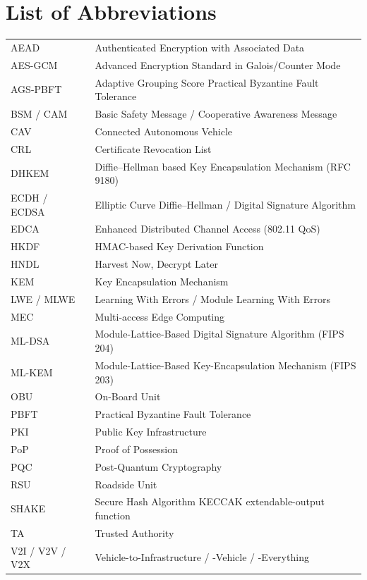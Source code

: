 \chapter*{List of Abbreviations}
\begin{longtable}{@{}p{3cm}p{11cm}@{}}
AEAD & Authenticated Encryption with Associated Data \\
AES-GCM & Advanced Encryption Standard in Galois/Counter Mode \\
AGS-PBFT & Adaptive Grouping Score Practical Byzantine Fault Tolerance \\
BSM / CAM & Basic Safety Message / Cooperative Awareness Message \\
CAV & Connected Autonomous Vehicle \\
CRL & Certificate Revocation List \\
DHKEM & Diffie--Hellman based Key Encapsulation Mechanism (RFC 9180) \\
ECDH / ECDSA & Elliptic Curve Diffie--Hellman / Digital Signature Algorithm \\
EDCA & Enhanced Distributed Channel Access (802.11 QoS) \\
HKDF & HMAC-based Key Derivation Function \\
HNDL & Harvest Now, Decrypt Later \\
KEM & Key Encapsulation Mechanism \\
LWE / MLWE & Learning With Errors / Module Learning With Errors \\
MEC & Multi-access Edge Computing \\
ML-DSA & Module-Lattice-Based Digital Signature Algorithm (FIPS 204) \\
ML-KEM & Module-Lattice-Based Key-Encapsulation Mechanism (FIPS 203) \\
OBU & On-Board Unit \\
PBFT & Practical Byzantine Fault Tolerance \\
PKI & Public Key Infrastructure \\
PoP & Proof of Possession \\
PQC & Post-Quantum Cryptography \\
RSU & Roadside Unit \\
SHAKE & Secure Hash Algorithm KECCAK extendable-output function \\
TA & Trusted Authority \\
V2I / V2V / V2X & Vehicle-to-Infrastructure / -Vehicle / -Everything \\
\end{longtable}
